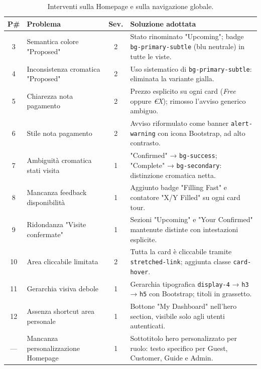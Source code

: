 \begin{table}[H]
\centering
\renewcommand{\arraystretch}{1.4}
\small
\begin{tabular}{|c|p{3.5cm}|c|p{7cm}|}
\hline
\textbf{P\#} & \textbf{Problema} & \textbf{Sev.} & \textbf{Soluzione adottata} \\ \hline
3  & Semantica colore "Proposed"        & 2 & Stato rinominato "Upcoming"; badge \texttt{bg-primary-subtle} (blu neutrale) in tutte le viste. \\ \hline
4  & Inconsistenza cromatica "Proposed" & 2 & Uso sistematico di \texttt{bg-primary-subtle}: eliminata la variante gialla. \\ \hline
5  & Chiarezza nota pagamento           & 2 & Prezzo esplicito su ogni card (\textit{Free} oppure \textit{€X}); rimosso l'avviso generico ambiguo. \\ \hline
6  & Stile nota pagamento               & 2 & Avviso riformulato come banner \texttt{alert-warning} con icona Bootstrap, ad alto contrasto. \\ \hline
7  & Ambiguità cromatica stati visita   & 1 & "Confirmed" → \texttt{bg-success}; "Complete" → \texttt{bg-secondary}: distinzione cromatica netta. \\ \hline
8  & Mancanza feedback disponibilità    & 1 & Aggiunto badge "Filling Fast" e contatore "X/Y Filled" su ogni card tour. \\ \hline
9  & Ridondanza "Visite confermate"     & 1 & Sezioni "Upcoming" e "Your Confirmed" mantenute distinte con intestazioni esplicite. \\ \hline
10 & Area cliccabile limitata           & 2 & Tutta la card è cliccabile tramite \texttt{stretched-link}; aggiunta classe \texttt{card-hover}. \\ \hline
11 & Gerarchia visiva debole            & 1 & Gerarchia tipografica \texttt{display-4} → \texttt{h3} → \texttt{h5} con Bootstrap; titoli in grassetto. \\ \hline
12 & Assenza shortcut area personale    & 1 & Bottone "My Dashboard" nell'hero section, visibile solo agli utenti autenticati. \\ \hline
—  & Mancanza personalizzazione Homepage & 1 & Sottotitolo hero personalizzato per ruolo: testo specifico per Guest, Customer, Guide e Admin. \\ \hline
\end{tabular}
\caption{Interventi sulla Homepage e sulla navigazione globale.}
\label{tab:fix_home}
\end{table}

